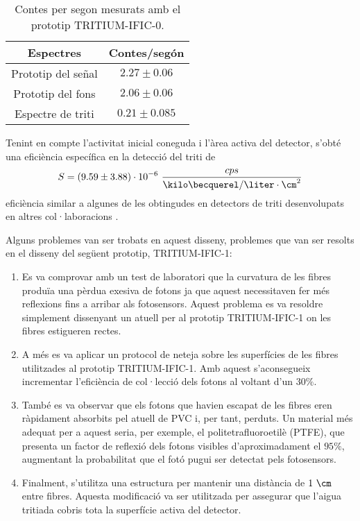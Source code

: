 \begin{table}[htbp]
\centering{}%
\begin{tabular}{cc}
\toprule 
Espectres & Contes/segón \tabularnewline
\midrule
\midrule 
Prototip del señal & $2.27 \pm 0.06$ \tabularnewline
Prototip del fons & $2.06 \pm 0.06$ \tabularnewline  
Espectre de triti & $0.21 \pm 0.085$ \tabularnewline
\bottomrule
\end{tabular}
\caption{Contes per segon mesurats amb el prototip TRITIUM-IFIC-0.}
\label{tab:ContesPerSegonTRITIUMIFIC0}
\end{table}

Tenint en compte l'activitat inicial coneguda i l'àrea activa del detector, s'obté una eficiència específica en la detecció del triti de
$$S = (9.59 \pm 3.88)\cdot{} 10^{-6}~\frac{cps}{\kilo\becquerel/\liter \cdot{} \cm^{2}}$$
eficiència similar a algunes de les obtingudes en detectors de triti desenvolupats en altres col·laboracions \cite{Muramatsu, Moghissi}.

Alguns problemes van ser trobats en aquest disseny, problemes que van ser resolts en el disseny del següent prototip, TRITIUM-IFIC-1:

\begin{enumerate}
\item{} Es va comprovar amb un test de laboratori que la curvatura de les fibres produïa una pèrdua exesiva de fotons ja que aquest necessitaven fer més reflexions fins a arribar als fotosensors. Aquest problema es va resoldre simplement dissenyant un atuell per al prototip TRITIUM-IFIC-1 on les fibres estigueren rectes.

\item{} A més es va aplicar un protocol de neteja sobre les superfícies de les fibres utilitzades al prototip TRITIUM-IFIC-1. Amb aquest s'aconsegueix incrementar l'eficiència de col·lecció dels fotons al voltant d'un $30\%$.

\item{} També es va observar que els fotons que havien escapat de les fibres eren ràpidament absorbits pel atuell de PVC i, per tant, perduts. Un material més adequat per a aquest seria, per exemple, el politetrafluoroetilè (PTFE), que presenta un factor de reflexió dels fotons visibles d'aproximadament el $95\%$, augmentant la probabilitat que el fotó pugui ser detectat pels fotosensors.

\item{} Finalment, s'utilitza una estructura per mantenir una distància de $1~\cm$ entre fibres. Aquesta modificació va ser utilitzada per assegurar que l'aigua tritiada cobris tota la superfície activa del detector.

\end{enumerate}

